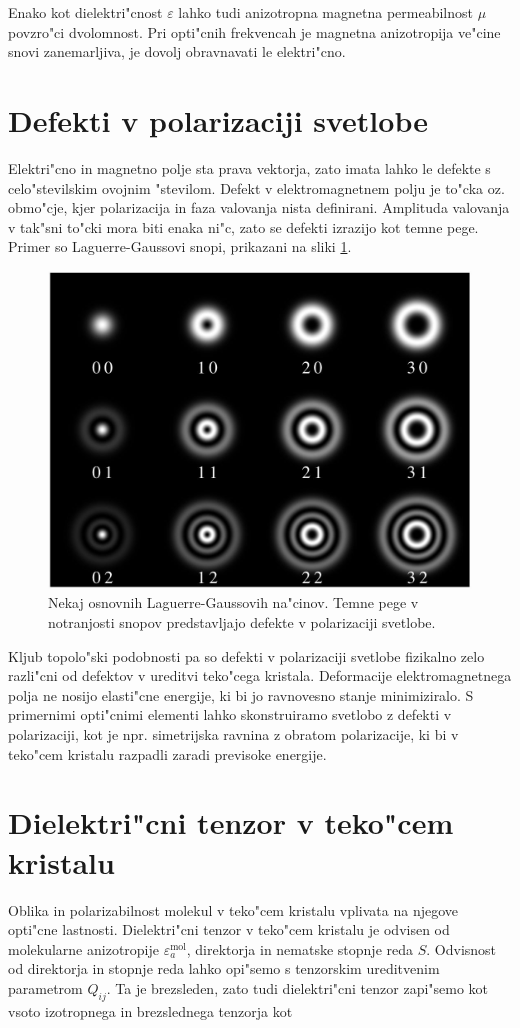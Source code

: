 \documentclass[12pt,twoside,openright,final]{report}
\begin{document}
Enako kot dielektri"cnost $\varepsilon$ lahko tudi anizotropna magnetna permeabilnost $\mu$ povzro"ci dvolomnost. 
Pri opti"cnih frekvencah je magnetna anizotropija ve"cine snovi zanemarljiva, je dovolj obravnavati le elektri"cno. 

\section{Defekti v polarizaciji svetlobe}
Elektri"cno in magnetno polje sta prava vektorja, zato imata lahko le defekte s celo"stevilskim ovojnim "stevilom. 
Defekt v elektromagnetnem polju je to"cka oz. obmo"cje, kjer polarizacija in faza valovanja nista definirani. 
Amplituda valovanja v tak"sni to"cki mora biti enaka ni"c, zato se defekti izrazijo kot temne pege. 
Primer so Laguerre-Gaussovi snopi, prikazani na sliki \ref{fig:laguerre-gauss}. 

\begin{figure}[h]
 \centering
 \includegraphics[width=.6\textwidth]{LG-wiki}
 \caption{Nekaj osnovnih Laguerre-Gaussovih na"cinov. Temne pege v notranjosti snopov predstavljajo defekte v polarizaciji svetlobe. \cite{lg-wiki}}
 \label{fig:laguerre-gauss}
\end{figure}

Kljub topolo"ski podobnosti pa so defekti v polarizaciji svetlobe fizikalno zelo razli"cni od defektov v ureditvi teko"cega kristala. 
Deformacije elektromagnetnega polja ne nosijo elasti"cne energije, ki bi jo ravnovesno stanje minimiziralo. 
S primernimi opti"cnimi elementi lahko skonstruiramo svetlobo z defekti v polarizaciji, kot je npr. simetrijska ravnina z obratom polarizacije, ki bi v teko"cem kristalu razpadli zaradi previsoke energije. 

\section{Dielektri"cni tenzor v teko"cem kristalu}
\label{sec:dielektricnost}
Oblika in polarizabilnost molekul v teko"cem kristalu vplivata na njegove opti"cne lastnosti. 
Dielektri"cni tenzor v teko"cem kristalu je odvisen od molekularne anizotropije $\varepsilon_{a}^{\mathrm{mol}}$, direktorja in nematske stopnje reda $S$. 
Odvisnost od direktorja in stopnje reda lahko opi"semo s tenzorskim ureditvenim parametrom $Q_{ij}$. 
Ta je brezsleden, zato tudi dielektri"cni tenzor zapi"semo kot vsoto izotropnega in brezslednega tenzorja kot\cite{degennes, ravnik-zumer-ldg}
\end{document}
